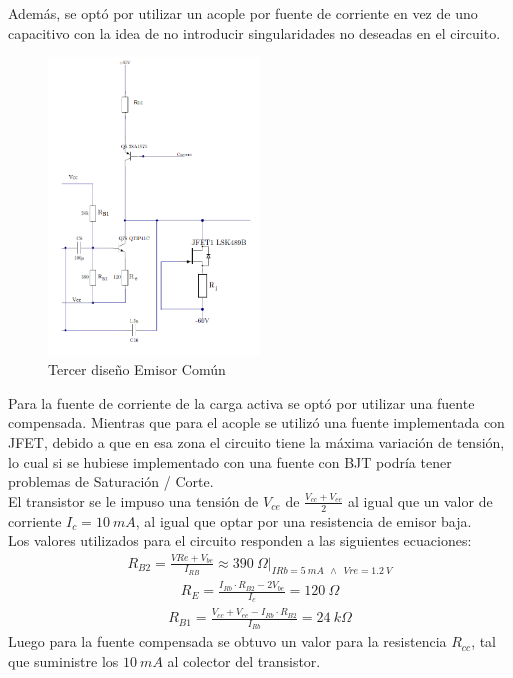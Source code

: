 Además, se optó por utilizar un acople por fuente de corriente en vez de uno capacitivo con la idea de no introducir singularidades no deseadas en el circuito.
 \begin{figure}[H]
\centering
	\includegraphics[width=0.5\textwidth]{ImagenesGain-Stage/ec3.png}
	\caption{Tercer diseño Emisor Común}
	\label{fig:ec3}
\end{figure}

Para la fuente de corriente de la carga activa se optó por utilizar una fuente compensada. Mientras que para el acople se utilizó una fuente implementada con JFET, debido a que en esa zona el circuito tiene la máxima variación de tensión, lo cual si se hubiese implementado con una fuente con BJT podría tener problemas de Saturación / Corte.\\
El transistor se le impuso una tensión de $V_{ce}$ de $\frac{V_{cc}+V_{ee}}{2}$ al igual que un valor de corriente $I_c = 10 \ mA$, al igual que optar por una resistencia de emisor baja.\\
Los valores utilizados para el circuito responden a las siguientes ecuaciones:
\begin{align}
R_{B2}= \frac{V{Re}+V_{be}}{I_{RB}} \approx 390 \ \Omega |_{IRb=5 \ mA \  \ \wedge \ \  Vre=1.2 \ V}
\end{align}
\begin{align}
R_E=\frac{I_{Rb}\cdot R_{B2}-2V_{be}}{I_c}=120 \ \Omega
\end{align}
\begin{align}
R_{B1}= \frac{V_{cc}+V_{ee}-I_{Rb}\cdot R_{B2} }{I_{Rb}}=24 \ k\Omega
\end{align}
Luego para la fuente compensada se obtuvo un valor para la resistencia $R_{cc}$, tal que suministre los $10 \ mA$ al colector del transistor.

